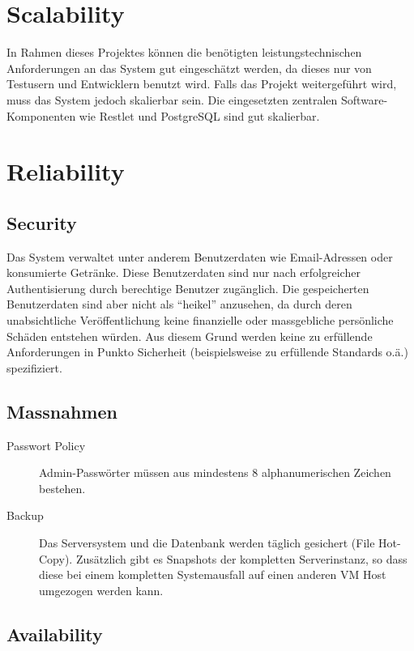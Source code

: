 \documentclass[10pt,a4paper]{scrartcl}
\begin{document}
\section{Scalability}

In Rahmen dieses Projektes können die benötigten leistungstechnischen Anforderungen an das System gut eingeschätzt werden, da dieses nur von Testusern und Entwicklern benutzt wird. Falls das Projekt weitergeführt wird, muss das System jedoch skalierbar sein. Die eingesetzten zentralen Software-Komponenten wie Restlet und PostgreSQL sind gut skalierbar\cite{smith2010postgresql}.


\section{Reliability}

	\subsection{Security}

	Das System verwaltet unter anderem Benutzerdaten wie Email-Adressen oder konsumierte Getränke. Diese Benutzerdaten sind nur nach erfolgreicher Authentisierung durch berechtige Benutzer zugänglich. Die gespeicherten Benutzerdaten sind aber nicht als ``heikel'' anzusehen, da durch deren unabsichtliche Veröffentlichung keine finanzielle oder massgebliche persönliche Schäden entstehen würden. Aus diesem Grund werden keine zu erfüllende Anforderungen in Punkto Sicherheit (beispielsweise zu erfüllende Standards o.ä.) spezifiziert.

	\subsection{Massnahmen}

	\begin{description}
		\item[Passwort Policy]
			Admin-Passwörter müssen aus mindestens 8 alphanumerischen Zeichen bestehen.
		\item[Backup]
			Das Serversystem und die Datenbank werden täglich gesichert (File Hot-Copy).
			Zusätzlich gibt es Snapshots der kompletten Serverinstanz, so dass diese bei einem kompletten Systemausfall auf einen anderen VM Host umgezogen werden kann.
	\end{description}

	\subsection{Availability}
\end{document}
